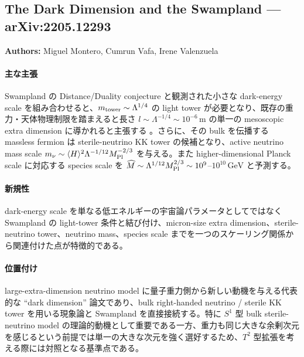 \subsection{The Dark Dimension and the Swampland --- arXiv:2205.12293}

\textbf{Authors:} Miguel Montero, Cumrun Vafa, Irene Valenzuela

\paragraph{主な主張}
Swampland の Distance/Duality conjecture と観測された小さな dark-energy scale を組み合わせると、$m_{\rm tower}\sim \Lambda^{1/4}$ の light tower が必要となり、既存の重力・天体物理制限を踏まえると長さ $l\sim \Lambda^{-1/4}\sim 10^{-6}\,\mathrm{m}$ の単一の mesoscopic extra dimension に導かれると主張する \cite{Montero:2022prj}。さらに、その bulk を伝播する massless fermion は sterile-neutrino KK tower の候補となり、active neutrino mass scale $m_\nu\sim \langle H\rangle^2\Lambda^{-1/12}M_{\rm Pl}^{-2/3}$ を与える。また higher-dimensional Planck scale に対応する species scale を $\widehat M\sim \Lambda^{1/12}M_{\rm Pl}^{2/3}\sim 10^{9}$--$10^{10}\,\mathrm{GeV}$ と予測する。

\paragraph{新規性}
dark-energy scale を単なる低エネルギーの宇宙論パラメータとしてではなく Swampland の light-tower 条件と結び付け、micron-size extra dimension、sterile-neutrino tower、neutrino mass、species scale までを一つのスケーリング関係から関連付けた点が特徴的である。

\paragraph{位置付け}
large-extra-dimension neutrino model に量子重力側から新しい動機を与える代表的な ``dark dimension'' 論文であり、bulk right-handed neutrino / sterile KK tower を用いる現象論と Swampland を直接接続する。特に $S^1$ 型 bulk sterile-neutrino model の理論的動機として重要である一方、重力も同じ大きな余剰次元を感じるという前提では単一の大きな次元を強く選好するため、$T^2$ 型拡張を考える際には対照となる基準点である。

